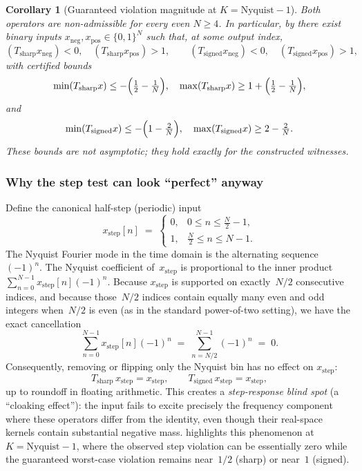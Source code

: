 \documentclass[11pt,a4paper]{article}
\theoremstyle{plain}
\newtheorem{corollary}[theorem]{Corollary}
\theoremstyle{definition}
\theoremstyle{plain}
\newcommand{\xneg}{x_{\mathrm{neg}}}
\newcommand{\xpos}{x_{\mathrm{pos}}}
\begin{document}
\begin{corollary}[Guaranteed violation magnitude at $K = \mathrm{Nyquist}-1$]
\label{cor:nyquist}
Both operators are non-admissible for every even $N \ge 4$.  In particular, by
 there exist binary inputs
$\xneg, \xpos \in \{0,1\}^N$ such that, at some output index,
\[
  (T_{\mathrm{sharp}}\xneg) < 0,
  \quad
  (T_{\mathrm{sharp}}\xpos) > 1,
  \qquad
  (T_{\mathrm{signed}}\xneg) < 0,
  \quad
  (T_{\mathrm{signed}}\xpos) > 1,
\]
with certified bounds
\[
  \min(T_{\mathrm{sharp}}x) \le -\Bigl(\tfrac{1}{2}-\tfrac{1}{N}\Bigr),
  \quad
  \max(T_{\mathrm{sharp}}x) \ge 1+\Bigl(\tfrac{1}{2}-\tfrac{1}{N}\Bigr),
\]
and
\[
  \min(T_{\mathrm{signed}}x) \le -\Bigl(1-\tfrac{2}{N}\Bigr),
  \quad
  \max(T_{\mathrm{signed}}x) \ge 2-\tfrac{2}{N}.
\]
These bounds are not asymptotic; they hold exactly for the constructed witnesses.
\end{corollary}


\subsubsection{Why the step test can look ``perfect'' anyway}
\label{sec:blind-spot}

Define the canonical half-step (periodic) input
\[
  x_{\mathrm{step}}[n] \;=\;
  \begin{cases}
    0, & 0 \le n \le \tfrac{N}{2}-1,\\
    1, & \tfrac{N}{2} \le n \le N-1.
  \end{cases}
\]
The Nyquist Fourier mode in the time domain is the alternating sequence~$(-1)^n$.
The Nyquist coefficient of~$x_{\mathrm{step}}$ is proportional to the inner
product $\sum_{n=0}^{N-1} x_{\mathrm{step}}[n](-1)^n$.  Because
$x_{\mathrm{step}}$ is supported on exactly~$N/2$ consecutive indices, and
because those~$N/2$ indices contain equally many even and odd integers
when~$N/2$ is even (as in the standard power-of-two setting), we have the exact
cancellation
\[
  \sum_{n=0}^{N-1} x_{\mathrm{step}}[n](-1)^n
  \;=\;
  \sum_{n=N/2}^{N-1} (-1)^n
  \;=\; 0.
\]
Consequently, removing or flipping only the Nyquist bin has no effect on
$x_{\mathrm{step}}$:
\[
  T_{\mathrm{sharp}}\,x_{\mathrm{step}} = x_{\mathrm{step}},
  \qquad
  T_{\mathrm{signed}}\,x_{\mathrm{step}} = x_{\mathrm{step}},
\]
up to roundoff in floating arithmetic.  This creates a \emph{step-response blind
spot} (a ``cloaking effect''): the input fails to excite precisely the frequency
component where these operators differ from the identity, even though their
real-space kernels contain substantial negative mass.   highlights
this phenomenon at $K = \mathrm{Nyquist}-1$, where the observed step violation
can be essentially zero while the guaranteed worst-case violation remains
near~$1/2$ (sharp) or near~$1$ (signed).
\end{document}
